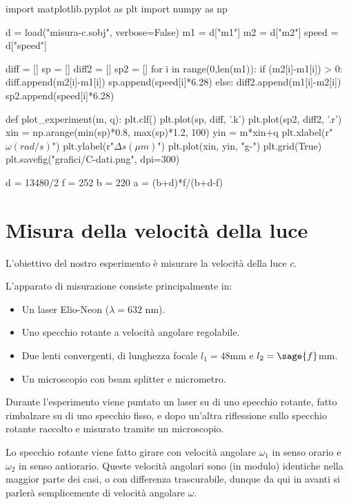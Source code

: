 \begin{sagesilent}
import matplotlib.pyplot as plt
import numpy as np

d = load("misura-c.sobj", verbose=False)
m1 = d["m1"]
m2 = d["m2"]
speed = d["speed"]

diff = []
sp = []
diff2 = []
sp2 = []
for i in range(0,len(m1)):
    if (m2[i]-m1[i]) > 0:
        diff.append(m2[i]-m1[i])
        sp.append(speed[i]*6.28)
    else:
        diff2.append(m1[i]-m2[i])
        sp2.append(speed[i]*6.28)

def plot_experiment(m, q):
    plt.clf()
    plt.plot(sp, diff, '.k')
    plt.plot(sp2, diff2, '.r')
    xin = np.arange(min(sp)*0.8, max(sp)*1.2, 100)
    yin = m*xin+q
    plt.xlabel(r"$\omega (rad/s)$")
    plt.ylabel(r"$\Delta s (\mu m)$")
    plt.plot(xin, yin, "g-")
    plt.grid(True)
    plt.savefig("grafici/C-dati.png", dpi=300)
    
d = 13480/2
f = 252
b = 220
a = (b+d)*f/(b+d-f)
\end{sagesilent}


\chapter{Misura della velocità della luce}

L'obiettivo del nostro esperimento è misurare la velocità della luce $c$.

L'apparato di misurazione consiste principalmente in:
\begin{itemize}
 \item Un laser Elio-Neon ($\lambda=632$ nm).
 \item Uno specchio rotante a velocità angolare regolabile.
 \item Due lenti convergenti, di lunghezza focale $l_1 = 48$mm e $l_2 = \sage{f}$mm.
 \item Un microscopio con beam splitter e micrometro.
\end{itemize}

Durante l'esperimento viene puntato un laser su di uno specchio rotante, fatto rimbalzare su di uno specchio fisso, e dopo un'altra riflessione sullo specchio rotante raccolto e misurato tramite un microscopio.

Lo specchio rotante viene fatto girare con velocità angolare $\omega_1$ in senso orario e $\omega_2$ in senso antiorario. Queste velocità angolari sono (in modulo) identiche nella maggior parte dei casi, o con differenza trascurabile, dunque da qui in avanti si parlerà semplicemente di velocità angolare $\omega$.

